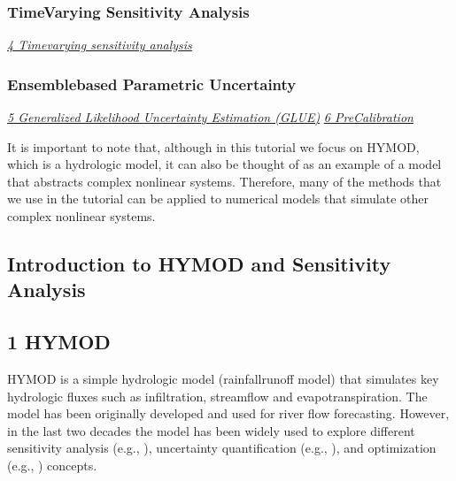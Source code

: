 \documentclass[letterpaper,10pt,english]{book}
\begin{document}
\subsubsection{Time\sphinxhyphen{}Varying Sensitivity Analysis}
\label{\detokenize{A2_Jupyter_Notebooks:time-varying-sensitivity-analysis}}
\sphinxAtStartPar
{\hyperref[\detokenize{A2_Jupyter_Notebooks:TVSA}]{\emph{4\sphinxhyphen{} Time\sphinxhyphen{}varying sensitivity analysis}}}


\subsubsection{Ensemble\sphinxhyphen{}based Parametric Uncertainty}
\label{\detokenize{A2_Jupyter_Notebooks:ensemble-based-parametric-uncertainty}}
\sphinxAtStartPar
{\hyperref[\detokenize{A2_Jupyter_Notebooks:GLUE}]{\emph{5\sphinxhyphen{} Generalized Likelihood Uncertainty Estimation (GLUE)}}} {\hyperref[\detokenize{A2_Jupyter_Notebooks:precalibration}]{\emph{6\sphinxhyphen{}
Pre\sphinxhyphen{}Calibration}}}

\sphinxAtStartPar
It is important to note that, although in this tutorial we focus on
HYMOD, which is a hydrologic model, it can also be thought of as an
example of a model that abstracts complex non\sphinxhyphen{}linear systems. Therefore,
many of the methods that we use in the tutorial can be applied to
numerical models that simulate other complex non\sphinxhyphen{}linear systems.


\subsection{Introduction to HYMOD and Sensitivity Analysis}
\label{\detokenize{A2_Jupyter_Notebooks:id3}}

\subsection{1\sphinxhyphen{} HYMOD}
\label{\detokenize{A2_Jupyter_Notebooks:hymod}}
\sphinxAtStartPar
HYMOD is a simple hydrologic model (rainfall\sphinxhyphen{}runoff model) that
simulates key hydrologic fluxes such as infiltration, streamflow and
evapotranspiration. The model has been originally developed and used for
river flow forecasting. However, in the last two decades the model has
been widely used to explore different sensitivity analysis (e.g.,
),
uncertainty quantification (e.g., ),
and optimization (e.g., )
concepts.
\end{document}

